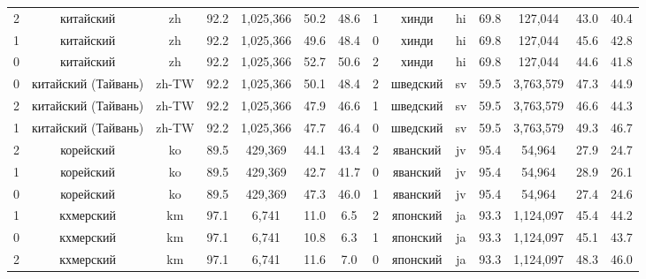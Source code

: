\begin{table*}
{\begin{tabular}{|c|c|c|c|c|c|c|||c|c|c|c|c|c|c|}
2 & китайский & zh & 92.2 & 1,025,366 & 50.2 & 48.6 & 1 & хинди & hi & 69.8 & 127,044 & 43.0 & 40.4\\
1 & китайский & zh & 92.2 & 1,025,366 & 49.6 & 48.4 & 0 & хинди & hi & 69.8 & 127,044 & 45.6 & 42.8\\
0 & китайский & zh & 92.2 & 1,025,366 & 52.7 & 50.6 & 2 & хинди & hi & 69.8 & 127,044 & 44.6 & 41.8\\
0 & китайский (Тайвань) & zh-TW & 92.2 & 1,025,366 & 50.1 & 48.4 & 2 & шведский & sv & 59.5 & 3,763,579 & 47.3 & 44.9\\
2 & китайский (Тайвань) & zh-TW & 92.2 & 1,025,366 & 47.9 & 46.6 & 1 & шведский & sv & 59.5 & 3,763,579 & 46.6 & 44.3\\
1 & китайский (Тайвань) & zh-TW & 92.2 & 1,025,366 & 47.7 & 46.4 & 0 & шведский & sv & 59.5 & 3,763,579 & 49.3 & 46.7\\
2 & корейский & ko & 89.5 & 429,369 & 44.1 & 43.4 & 2 & яванский & jv & 95.4 & 54,964 & 27.9 & 24.7\\
1 & корейский & ko & 89.5 & 429,369 & 42.7 & 41.7 & 0 & яванский & jv & 95.4 & 54,964 & 28.9 & 26.1\\
0 & корейский & ko & 89.5 & 429,369 & 47.3 & 46.0 & 1 & яванский & jv & 95.4 & 54,964 & 27.4 & 24.6\\
1 & кхмерский & km & 97.1 & 6,741 & 11.0 & 6.5 & 2 & японский & ja & 93.3 & 1,124,097 & 45.4 & 44.2\\
0 & кхмерский & km & 97.1 & 6,741 & 10.8 & 6.3 & 1 & японский & ja & 93.3 & 1,124,097 & 45.1 & 43.7\\
2 & кхмерский & km & 97.1 & 6,741 & 11.6 & 7.0 & 0 & японский & ja & 93.3 & 1,124,097 & 48.3 & 46.0\\ \hline
\end{tabular}
}
\end{table*}

%
%
%
